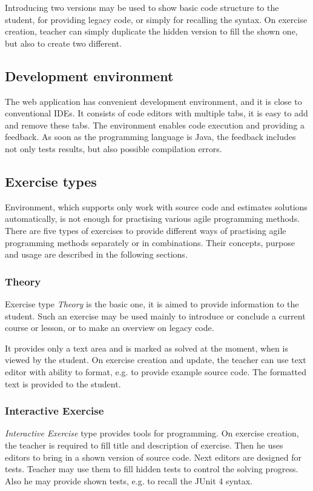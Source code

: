         Introducing two versions may be used to show basic code structure to the student, for providing legacy code, or simply for recalling the syntax. On exercise creation, teacher can simply duplicate the hidden version to fill the shown one, but also to create two different.
        
        \subsection{Development environment}
        The web application has convenient development environment, and it is close to conventional IDEs. It consists of code editors with multiple tabs, it is easy to add and remove these tabs. The environment enables code execution and providing a feedback. As soon as the programming language is Java, the feedback includes not only tests results, but also possible compilation errors.

        \subsection{Exercise types}
        \label{subsec:exercise-types}
        Environment, which supports only work with source code and estimates solutions automatically, is not enough for practising various agile programming methods. There are five types of exercises to provide different ways of practising agile programming methods separately or in combinations. Their concepts, purpose and usage are described in the following sections.
            
            
            \subsubsection{Theory}
            Exercise type \textit{Theory} is the basic one, it is aimed to provide information to the student. Such an exercise may be used mainly to introduce or conclude a current course or lesson, or to make an overview on legacy code.
            
            It provides only a text area and is marked as solved at the moment, when is viewed by the student. On exercise creation and update, the teacher can use text editor with ability to format, e.g. to provide example source code. The formatted text is provided to the student.
        
        
            \subsubsection{Interactive Exercise}
            \label{subsubsec:whitebox}
            \textit{Interactive Exercise} type provides tools for programming.
            On exercise creation, the teacher is required to fill title and description of exercise. Then he uses editors to bring in a shown version of source code. Next editors are designed for tests. Teacher may use them to fill hidden tests to control the solving progress. Also he may provide shown tests, e.g. to recall the JUnit 4 syntax.
            
